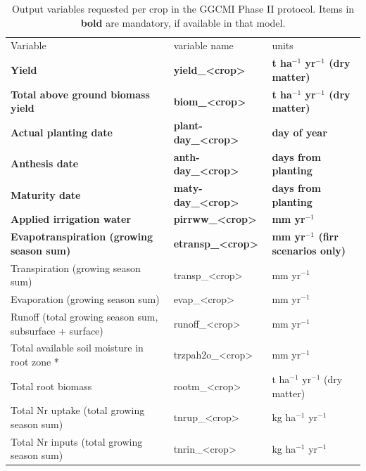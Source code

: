 \documentclass[gmd, manuscript]{copernicus} %
\begin{document}
\begin{table}[]
\caption{Output variables requested per crop in the GGCMI Phase II protocol. Items in \textbf{bold} are mandatory, if available in that model.}
\label{table:outputs}
\begin{tabular}{lll}
        \tophline \vspace{1mm}
Variable                                & variable name             & units \\
\middlehline \vspace{1mm}
\textbf{Yield}                                   & \textbf{yield\_<crop>}     & \textbf{t ha$^{-1}$ yr$^{-1}$ (dry matter)}\\
\textbf{Total above ground biomass yield}        & \textbf{biom\_<crop>}      & \textbf{t ha$^{-1}$ yr$^{-1}$ (dry matter)}\\
\textbf{Actual planting date}                    & \textbf{plant-day\_<crop>} & \textbf{day of year}\\
\textbf{Anthesis date}                           & \textbf{anth-day\_<crop>}  & \textbf{days from planting} \\
\textbf{Maturity date}                           & \textbf{maty-day\_<crop>}  & \textbf{days from planting}\\
\textbf{Applied irrigation water}                & \textbf{pirrww\_<crop>}    & \textbf{mm yr$^{-1}$} \\
\textbf{Evapotranspiration (growing season sum)} & \textbf{etransp\_<crop>}   & \textbf{mm yr$^{-1}$ (firr scenarios only)}\\ \middlehline
Transpiration (growing season sum)                       & transp\_<crop>    & mm yr$^{-1}$ \\
Evaporation (growing season sum)                         & evap\_<crop>      & mm yr$^{-1}$ \\
Runoff (total growing season sum, subsurface + surface)  & runoff\_<crop>    & mm yr$^{-1}$                    \\
Total available soil moisture in root zone *             & trzpah2o\_<crop>  & mm yr$^{-1}$                    \\
Total root biomass                                       & rootm\_<crop>     & t ha$^{-1}$ yr$^{-1}$ (dry matter)  \\
Total Nr uptake (total growing season sum)               & tnrup\_<crop>     & kg ha$^{-1}$ yr$^{-1}$              \\
Total Nr inputs (total growing season sum)               & tnrin\_<crop>     & kg ha$^{-1}$ yr$^{-1}$              \\

\end{tabular}
\end{table}
\end{document}
